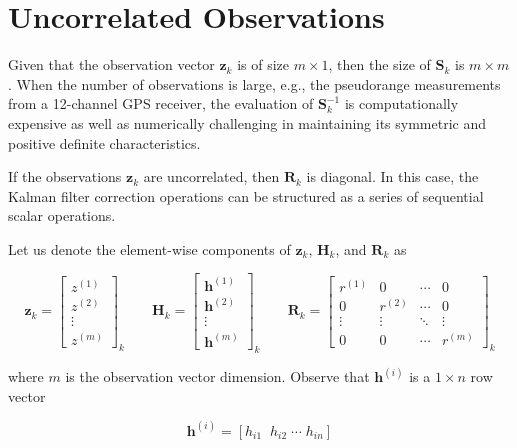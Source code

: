 \section{Uncorrelated Observations}
\label{Uncorrelated Observations}

Given that the observation vector $\mathbf{z}_k$ is of size $m \times 1$, then the size of
$\mathbf{S}_k$ is $m \times m$.
When the number of observations is large, e.g., the pseudorange measurements from a
12-channel GPS receiver, the evaluation of $\mathbf{S}_k^{-1}$ is computationally expensive
as well as numerically challenging in maintaining its symmetric and positive definite
characteristics.

If the observations $\mathbf{z}_k$ are uncorrelated, then $\mathbf{R}_k$ is diagonal.
In this case, the Kalman filter correction operations can be structured as a series of
sequential scalar operations.

Let us denote the element-wise components of $\mathbf{z}_k$, $\mathbf{H}_k$, and
$\mathbf{R}_k$ as

\begin{equation*}
    \mathbf{z}_k =
    \begin{bmatrix}
        z^{(1)} \\
        z^{(2)} \\
        \vdots \\
        z^{(m)}
    \end{bmatrix}_k
    \phantom{MM}
    \mathbf{H}_k =
    \begin{bmatrix}
        \mathbf{h}^{(1)} \\
        \mathbf{h}^{(2)} \\
        \vdots \\
        \mathbf{h}^{(m)}
    \end{bmatrix}_k
    \phantom{MM}
    \mathbf{R}_k =
    \begin{bmatrix}
        r^{(1)} & 0 & \cdots & 0  \\
        0 & r^{(2)} & \cdots & 0 \\
        \vdots & \vdots & \ddots & \vdots \\
        0 & 0 & \cdots & r^{(m)}
    \end{bmatrix}_k
\end{equation*}

where $m$ is the observation vector dimension. Observe that $\mathbf{h}^{(i)}$ is a
$1 \times n$ row vector

\begin{equation*}
    \mathbf{h}^{(i)} = \left[ h_{i1} \;\; h_{i2} \; \cdots \; h_{in} \right]
\end{equation*}

